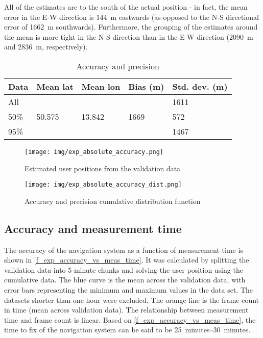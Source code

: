 All of the estimates are to the south of the actual position - in fact, the mean error in the E-W direction is \qty{144}{m} eastwards (as opposed to the N-S directional error of \qty{1662}{m} southwards). Furthermore, the grouping of the estimates around the mean is more tight in the N-S direction than in the E-W direction (\qty{2090}{m} and \qty{2836}{m}, respectively).


\begin{table}
    \centering
    \begin{tabular}{l|llll}
Data & Mean lat & Mean lon & Bias (m) & Std. dev. (m)\\ \hline
All  & & &                           & 1611 \\
50\% & 50.575  & 13.842   & 1669     & 572  \\
95\% & & &                           & 1467 \\
    \end{tabular}
    \caption{Accuracy and precision}
    \label{t_exp_accuracy}
\end{table}

\begin{figure}
    \centering
    \texttt{[image: img/exp\_absolute\_accuracy.png]}
    \caption{Estimated user positions from the validation data}
    \label{f_exp_absolute_accuracy}
\end{figure}

\begin{figure}
    \centering
    \texttt{[image: img/exp\_absolute\_accuracy\_dist.png]}
    \caption{Accuracy and precision cumulative distribution function}
    \label{f_exp_absolute_accuracy_dist}
\end{figure}


\subsection{Accuracy and measurement time}
The accuracy of the navigation system as a function of measurement time is shown in \autoref{f_exp_accuracy_vs_meas_time}. It was calculated by splitting the validation data into 5-minute chunks and solving the user position using the cumulative data. The blue curve is the mean across the validation data, with error bars representing the minimum and maximum values in the data set. The datasets shorter than one hour were excluded. The orange line is the frame count in time (mean across validation data). The relationship between measurement time and frame count is linear. Based on \autoref{f_exp_accuracy_vs_meas_time}, the time to fix of the navigation system can be said to be \qtyrange{25}{30}{minutes}.


